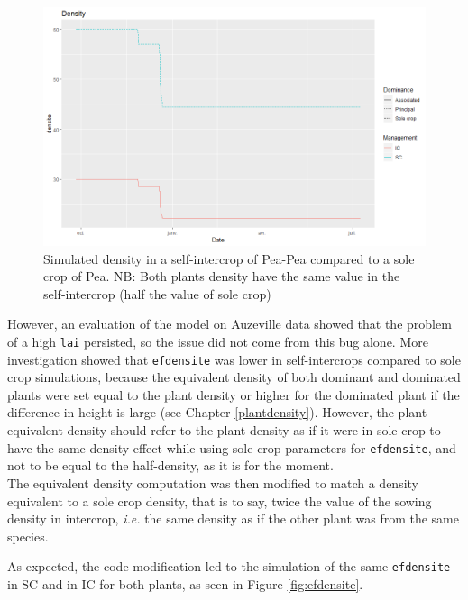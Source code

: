 \documentclass[
]{book}
\begin{document}
\begin{figure}
\centering
\includegraphics{img/densitefrost.png}
\caption{\label{fig:densitefrost}Simulated density in a self-intercrop of Pea-Pea compared to a sole crop of Pea. NB: Both plants density have the same value in the self-intercrop (half the value of sole crop)}
\end{figure}

However, an evaluation of the model on Auzeville data showed that the problem of a high \texttt{lai} persisted, so the issue did not come from this bug alone.
More investigation showed that \texttt{efdensite} was lower in self-intercrops compared to sole crop simulations, because the equivalent density of both dominant and dominated plants were set equal to the plant density or higher for the dominated plant if the difference in height is large (see Chapter \ref{plantdensity}). However, the plant equivalent density should refer to the plant density as if it were in sole crop to have the same density effect while using sole crop parameters for \texttt{efdensite}, and not to be equal to the half-density, as it is for the moment.\\
The equivalent density computation was then modified to match a density equivalent to a sole crop density, that is to say, twice the value of the sowing density in intercrop, \emph{i.e.} the same density as if the other plant was from the same species.

As expected, the code modification led to the simulation of the same \texttt{efdensite} in SC and in IC for both plants, as seen in Figure \ref{fig:efdensite}.
\end{document}
